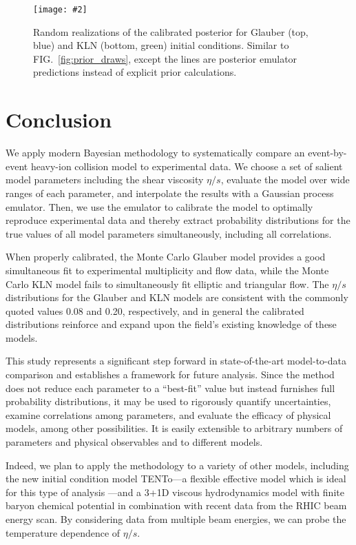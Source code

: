 \documentclass[aps,prc,reprint,superscriptaddress,amsmath]{revtex4-1}
\newcommand{\widefig}[3][t]{
  \begin{figure*}[#1]
    \texttt{[image: \#2]}
    \caption{\label{fig:#2}#3}
  \end{figure*}
}
\newcommand{\trento}{T\raisebox{-.5ex}{R}ENTo}
\begin{document}
\widefig{post_draws}{
  Random realizations of the calibrated posterior for Glauber (top, blue) and KLN (bottom, green) initial conditions.
  Similar to FIG.~\ref{fig:prior_draws},
  except the lines are posterior emulator predictions instead of explicit prior calculations.
}



\section{Conclusion}

We apply modern Bayesian methodology to systematically compare an event-by-event heavy-ion collision model to experimental data.
We choose a set of salient model parameters including the shear viscosity $\eta/s$, evaluate the model over wide ranges of each parameter, and interpolate the results with a Gaussian process emulator.
Then, we use the emulator to calibrate the model to optimally reproduce experimental data and thereby extract probability distributions for the true values of all model parameters simultaneously, including all correlations.

When properly calibrated, the Monte Carlo Glauber model provides a good simultaneous fit to experimental multiplicity and flow data, while the Monte Carlo KLN model fails to simultaneously fit elliptic and triangular flow.
The $\eta/s$ distributions for the Glauber and KLN models are consistent with the commonly quoted values 0.08 and 0.20, respectively, and in general the calibrated distributions reinforce and expand upon the field's existing knowledge of these models.

This study represents a significant step forward in state-of-the-art model-to-data comparison and establishes a framework for future analysis.
Since the method does not reduce each parameter to a ``best-fit'' value but instead furnishes full probability distributions, it may be used to rigorously quantify uncertainties, examine correlations among parameters, and evaluate the efficacy of physical models, among other possibilities.
It is easily extensible to arbitrary numbers of parameters and physical observables and to different models.

Indeed, we plan to apply the methodology to a variety of other models, including the new initial condition model \trento---a flexible effective model which is ideal for this type of analysis \cite{Moreland:2014oya}---and a 3+1D viscous hydrodynamics model with finite baryon chemical potential in combination with recent data from the RHIC beam energy scan.
By considering data from multiple beam energies, we can probe the temperature dependence of $\eta/s$.
\end{document}
